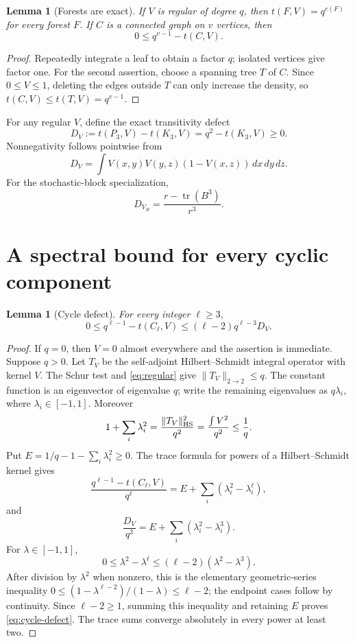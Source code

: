 \documentclass[11pt]{article}
\newtheorem{lemma}[theorem]{Lemma}
\newcommand{\dd}{\,d}
\begin{document}
\begin{lemma}[Forests are exact]\label{lem:forest}
If $V$ is regular of degree $q$, then
$t(F,V)=q^{e(F)}$ for every forest $F$.  If $C$ is a connected graph on
$v$ vertices, then
\[
 0\leq q^{v-1}-t(C,V).
\]
\end{lemma}

\begin{proof}
Repeatedly integrate a leaf to obtain a factor $q$; isolated vertices give
factor one.  For the second assertion, choose a spanning tree $T$ of $C$.
Since $0\leq V\leq1$, deleting the edges outside $T$ can only increase the
density, so $t(C,V)\leq t(T,V)=q^{v-1}$.
\end{proof}

For any regular $V$, define the exact transitivity defect
\begin{equation}
 D_V:=t(P_3,V)-t(K_3,V)=q^2-t(K_3,V)\geq0.
 \label{eq:D}
\end{equation}
Nonnegativity follows pointwise from
\[
 D_V=\int V(x,y)V(y,z)(1-V(x,z))
       \dd x\dd y\dd z.
\]
For the stochastic-block specialization,
\begin{equation}
 D_{V_B}=\frac{r-\operatorname{tr}(B^3)}{r^3}.
 \label{eq:block-D}
\end{equation}

\section{A spectral bound for every cyclic component}

\begin{lemma}[Cycle defect]\label{lem:cycle}
For every integer $\ell\geq3$,
\begin{equation}
 0\leq q^{\ell-1}-t(C_\ell,V)
 \leq (\ell-2)q^{\ell-3}D_V.
 \label{eq:cycle-defect}
\end{equation}
\end{lemma}

\begin{proof}
If $q=0$, then $V=0$ almost everywhere and the assertion is immediate.
Suppose $q>0$.  Let $T_V$ be the self-adjoint Hilbert--Schmidt integral
operator with kernel $V$.  The Schur test and \eqref{eq:regular} give
$\lVert T_V\rVert_{2\to2}\leq q$.  The constant function is an eigenvector
of eigenvalue $q$; write the remaining eigenvalues as $q\lambda_i$, where
$\lambda_i\in[-1,1]$.  Moreover
\[
 1+\sum_i\lambda_i^2
 =\frac{\lVert T_V\rVert_{\rm HS}^2}{q^2}
 =\frac{\int V^2}{q^2}
 \leq\frac1q.
\]
Put
$E=1/q-1-\sum_i\lambda_i^2\geq0$.  The trace formula for powers of a
Hilbert--Schmidt kernel gives
\[
 \frac{q^{\ell-1}-t(C_\ell,V)}{q^\ell}
 =E+\sum_i(\lambda_i^2-\lambda_i^\ell),
\]
and
\[
 \frac{D_V}{q^3}=E+\sum_i(\lambda_i^2-\lambda_i^3).
\]
For $\lambda\in[-1,1]$,
\[
 0\leq\lambda^2-\lambda^\ell
 \leq(\ell-2)(\lambda^2-\lambda^3).
\]
After division by $\lambda^2$ when nonzero, this is the elementary
geometric-series inequality
$0\leq(1-\lambda^{\ell-2})/(1-\lambda)\leq\ell-2$; the endpoint cases
follow by continuity.  Since $\ell-2\geq1$, summing this inequality and
retaining $E$ proves \eqref{eq:cycle-defect}.  The trace sums converge
absolutely in every power at least two.
\end{proof}
\end{document}
